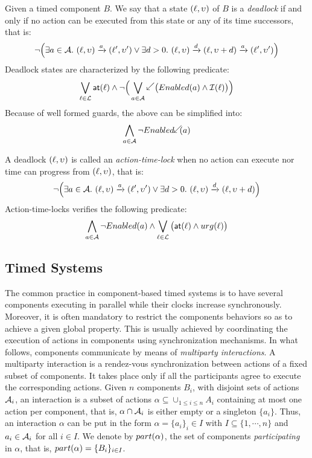 \begin{definition}[Deadlocks]\label{def:dl}
  Given a timed component $B$. We say that a state $(\ell,\upsilon)$ of $B$ is 
  a \emph{deadlock} if and only if no action can be executed from this state
  or any of its time successors, that is:
  \begin{displaymath}
    \neg\Big(\exists a\in\mc{A}. \ (\loc,\val)\transit{a}(\loc',\val')\vee
    \exists d>0. \ (\loc,\val)\transit{d}(\loc,\val+d)\transit{a}(\loc',\val')\Big)
  \end{displaymath}
  Deadlock states are characterized by the following predicate:
  \begin{displaymath}
   \bigvee_{\loc\in\Loc}\al{\loc}\wedge
 \neg\Big(\bigvee_{a\in\mc{A}}
    \backward\big(\enabled{a}\wedge\Inv{\loc}\big)\Big)
  \end{displaymath}
  Because of well formed guards, the above can be simplified into:
  \begin{equation}\label{eq:dl}
    \bigwedge_{a\in\mc{A}}\neg\enabledbackward{a}
  \end{equation}
\end{definition}
A deadlock $(\ell,\upsilon)$ is called an \emph{action-time-lock} when no action can
execute nor time can progress from $(\ell,\upsilon)$, that is:
  \begin{displaymath}
    \neg\Big(\exists a\in\mc{A}. \ (\loc,\val)\transit{a}(\loc',\val')\vee
    \exists d>0. \ (\loc,\val)\transit{d}(\loc,\val+d)\Big)
  \end{displaymath}
  Action-time-locks verifies the following predicate:
  \begin{equation}\label{eq:atl}
    \bigwedge_{a\in\mathcal{A}}\neg Enabled(a)\wedge\bigvee_{\ell\in\mathcal{L}}
    \big(\textsf{at}(\ell)\wedge urg(\ell)\big)
  \end{equation}
\subsection{Timed Systems}
The common practice in component-based timed systems is to have several components
executing in parallel while their clocks increase synchronously. Moreover,
it is often mandatory to restrict the components behaviors so as to achieve 
a given global property. This is usually achieved by coordinating the execution of 
actions in components using synchronization mechanisms.
In what follows, components communicate by means
of \emph{multiparty interactions}. A multiparty interaction is a rendez-vous 
synchronization between actions of a fixed subset of components. It takes place 
only if all the participants agree to execute the corresponding actions. Given 
$n$ components $B_i$, with disjoint sets of actions $\mathcal{A}_i$, an interaction
is a subset of actions $\alpha\subseteq\cup_{1\le i\le n}A_i$ containing at most
one action per component, that is, $\alpha\cap\mathcal{A}_i$ is either empty or a 
singleton $\{a_i\}$. Thus, an interaction $\alpha$ can be put in the form
$\alpha=\{a_i\}_i{\in{I}}$ with $I\subseteq\{1,\cdots,n\}$ and $a_i\in\mathcal{A}_i$
for all $i\in{I}$. We denote by $part(\alpha)$, the set of components \emph{participating}
in $\alpha$, that is, $part(\alpha)=\{B_i\}_{i\in{I}}$.

